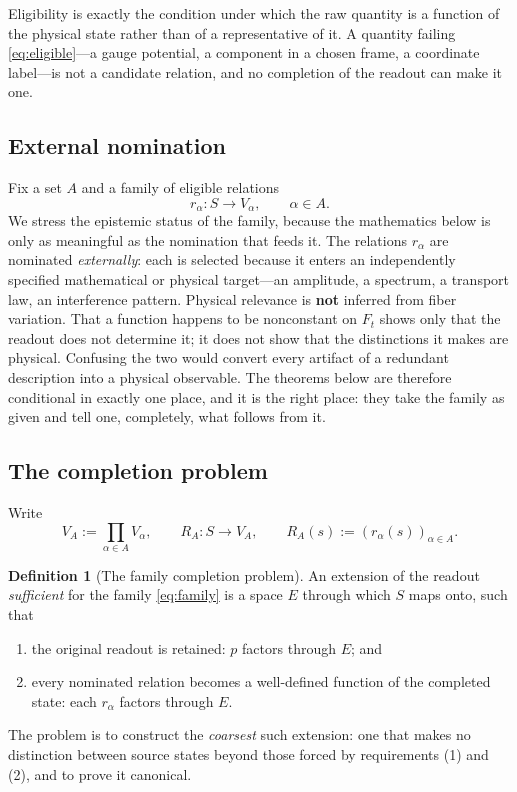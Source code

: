 \documentclass[11pt,reqno]{amsart}
\theoremstyle{plain}
\theoremstyle{definition}
\newtheorem{definition}[theorem]{Definition}
\theoremstyle{remark}
\numberwithin{equation}{section}
\begin{document}
Eligibility is exactly the condition under which the raw quantity is a function of the physical
state rather than of a representative of it. A quantity failing \eqref{eq:eligible}---a gauge
potential, a component in a chosen frame, a coordinate label---is not a candidate relation, and no
completion of the readout can make it one.

\subsection{External nomination}

Fix a set $A$ and a family of eligible relations
\begin{equation}
\label{eq:family}
r_\alpha\colon S\longrightarrow V_\alpha,\qquad \alpha\in A .
\end{equation}
We stress the epistemic status of the family, because the mathematics below is only as meaningful as
the nomination that feeds it. The relations $r_\alpha$ are nominated \emph{externally}: each is
selected because it enters an independently specified mathematical or physical target---an
amplitude, a spectrum, a transport law, an interference pattern. Physical relevance is
\textbf{not} inferred from fiber variation. That a function happens to be nonconstant on $F_t$ shows
only that the readout does not determine it; it does not show that the distinctions it makes are
physical. Confusing the two would convert every artifact of a redundant description into a physical
observable. The theorems below are therefore conditional in exactly one place, and it is the right
place: they take the family as given and tell one, completely, what follows from it.

\subsection{The completion problem}

Write
\begin{equation}
\label{eq:VA-RA}
V_A:=\prod_{\alpha\in A}V_\alpha,
\qquad
R_A\colon S\to V_A,
\qquad
R_A(s):=(r_\alpha(s))_{\alpha\in A}.
\end{equation}

\begin{definition}[The family completion problem]
\label{def:problem}
An extension of the readout \emph{sufficient} for the family \eqref{eq:family} is a space $E$
through which $S$ maps onto, such that
\begin{enumerate}
\item the original readout is retained: $p$ factors through $E$; and
\item every nominated relation becomes a well-defined function of the completed state: each
$r_\alpha$ factors through $E$.
\end{enumerate}
The problem is to construct the \emph{coarsest} such extension: one that makes no distinction
between source states beyond those forced by requirements (1) and (2), and to prove it canonical.
\end{definition}
\end{document}
